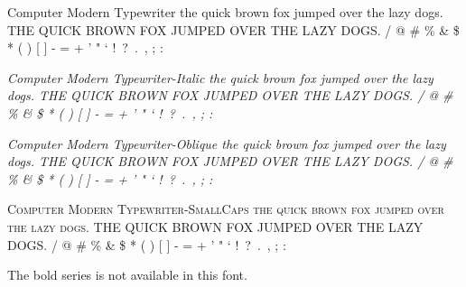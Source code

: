 \documentclass{article}
\begin{document}
{\selectfont
Computer Modern Typewriter \newline
the quick brown fox jumped over the lazy dogs. \newline
THE QUICK BROWN FOX JUMPED OVER THE LAZY DOGS.  / @ \# \% \& \$ * ( ) [ ] - = + ' " ` !\ ?\ .\ , ; : \par
{\itshape
Computer Modern Typewriter-Italic \newline
the quick brown fox jumped over the lazy dogs. \newline
THE QUICK BROWN FOX JUMPED OVER THE LAZY DOGS.  / @ \# \% \& \$ * ( ) [ ] - = + ' " ` !\ ?\ .\ , ; : }\par
{\slshape
Computer Modern Typewriter-Oblique \newline
the quick brown fox jumped over the lazy dogs. \newline
THE QUICK BROWN FOX JUMPED OVER THE LAZY DOGS.  / @ \# \% \& \$ * ( ) [ ] - = + ' " ` !\ ?\ .\ , ; : }}\par
{\scshape
Computer Modern Typewriter-SmallCaps \newline
the quick brown fox jumped over the lazy dogs. \newline
THE QUICK BROWN FOX JUMPED OVER THE LAZY DOGS.  / @ \# \% \& \$ * ( ) [ ] - = + ' " ` !\ ?\ .\ , ; : }\par
\noindent
The bold series is not available in this font. \par
\newpage
\end{document}
